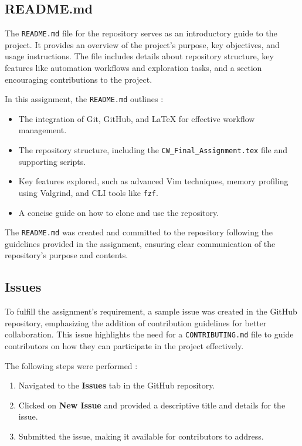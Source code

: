 \documentclass[12pt]{article}
\begin{document}
    \subsection{README.md}

        The \texttt{README.md} file for the repository serves as an introductory guide to the project. It provides an overview of the project’s purpose, key objectives, and usage instructions. The file includes details about repository structure, key features like automation workflows and exploration tasks, and a section encouraging contributions to the project.

        In this assignment, the \texttt{README.md} outlines :
        \begin{itemize}
            \item The integration of Git, GitHub, and LaTeX for effective workflow management.
            \item The repository structure, including the \texttt{CW\_Final\_Assignment.tex} file and supporting scripts.
            \item Key features explored, such as advanced Vim techniques, memory profiling using Valgrind, and CLI tools like \texttt{fzf}.
            \item A concise guide on how to clone and use the repository.
        \end{itemize}

        The \texttt{README.md} was created and committed to the repository following the guidelines provided in the assignment, ensuring clear communication of the repository’s purpose and contents.

        \vspace{1cm}

        \subsection{Issues}

            To fulfill the assignment's requirement, a sample issue was created in the GitHub repository, emphasizing the addition of contribution guidelines for better collaboration. This issue highlights the need for a \texttt{CONTRIBUTING.md} file to guide contributors on how they can participate in the project effectively.

            The following steps were performed :
            \begin{enumerate}
                \item Navigated to the \textbf{Issues} tab in the GitHub repository.
                \item Clicked on \textbf{New Issue} and provided a descriptive title and details for the issue.
                \item Submitted the issue, making it available for contributors to address.
            \end{enumerate}
\end{document}
